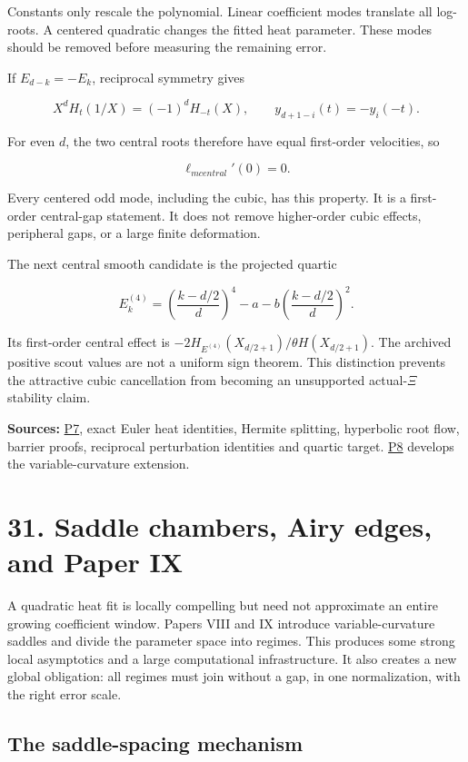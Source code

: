 \documentclass[
  10pt,
  a4paper,
  10pt,
  oneside,
  openany]{book}
\begin{document}
Constants only rescale the polynomial. Linear coefficient modes
translate all log-roots. A centered quadratic changes the fitted heat
parameter. These modes should be removed before measuring the remaining
error.

If \(E_{d-k}=-E_k\), reciprocal symmetry gives

\[
 X^dH_t(1/X)=(-1)^dH_{-t}(X),
 \qquad y_{d+1-i}(t)=-y_i(-t).
\]

For even \(d\), the two central roots therefore have equal first-order
velocities, so

\[
 \boxed{\ell_{
m central}'(0)=0.}
 \tag{30.9}\label{eq:30.9}
\]

Every centered odd mode, including the cubic, has this property. It is a
first-order central-gap statement. It does not remove higher-order cubic
effects, peripheral gaps, or a large finite deformation.

The next central smooth candidate is the projected quartic

\[
 E_k^{(4)}=\left(\frac{k-d/2}{d}\right)^4-a-b\left(\frac{k-d/2}{d}\right)^2.
\]

Its first-order central effect is
\(-2H_{E^{(4)}}(X_{d/2+1})/\theta H(X_{d/2+1})\). The archived positive
scout values are not a uniform sign theorem. This distinction prevents
the attractive cubic cancellation from becoming an unsupported
actual-\(\Xi\) stability claim.

\textbf{Sources:} \hyperref[source-p7]{P7}, exact Euler heat identities,
Hermite splitting, hyperbolic root flow, barrier proofs, reciprocal
perturbation identities and quartic target. \hyperref[source-p8]{P8}
develops the variable-curvature extension.

\section{31. Saddle chambers, Airy edges, and Paper
IX}\label{ch-paper-nine}

A quadratic heat fit is locally compelling but need not approximate an
entire growing coefficient window. Papers VIII and IX introduce
variable-curvature saddles and divide the parameter space into regimes.
This produces some strong local asymptotics and a large computational
infrastructure. It also creates a new global obligation: all regimes
must join without a gap, in one normalization, with the right error
scale.

\subsection{The saddle-spacing
mechanism}\label{the-saddle-spacing-mechanism}
\end{document}
